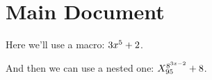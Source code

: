 \documentclass{amsart}
\begin{document}
\section{Main Document}

Here we'll use a macro: $3x^5 + 2$.

And then we can use a nested one: $X^{8^{3x-2}}_{95} + 8$.


\end{document}
